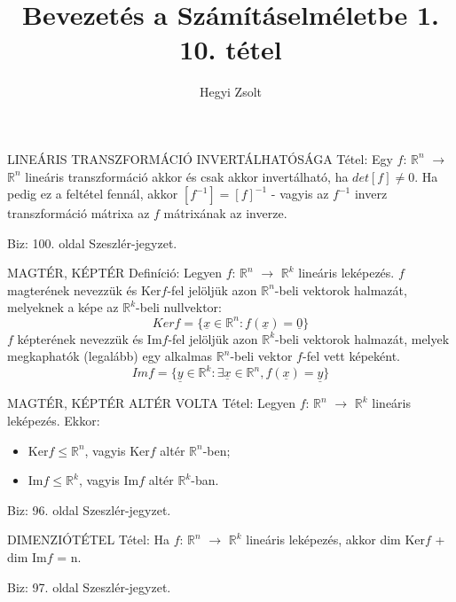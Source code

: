 \documentclass[]{article}
\title{Bevezetés a Számításelméletbe 1.\\{\large 10. tétel}}
\author{Hegyi Zsolt}
\newcommand{\R}{\mathbb{R}}
\newcommand{\Rn}[1]{$\mathbb{R}^{#1}$}
\newcommand{\Und}[1]{\underline{#1}}
\begin{document}
\maketitle{}
\begin{framed}
LINEÁRIS TRANSZFORMÁCIÓ INVERTÁLHATÓSÁGA Tétel: Egy $f$: \Rn{n} $\rightarrow$ \Rn{n} lineáris transzformáció akkor és csak akkor invertálható, ha $det[f] \neq 0$. Ha pedig ez a feltétel fennál, akkor $[f^{-1}] = [f]^{-1}$ - vagyis az $f^{-1}$ inverz transzformáció mátrixa az $f$ mátrixának az inverze.
\end{framed}
\begin{leftbar}
Biz: 100. oldal Szeszlér-jegyzet.
\end{leftbar}
\begin{shaded}
MAGTÉR, KÉPTÉR Definíció: Legyen $f$: \Rn{n} $\rightarrow$ \Rn{k} lineáris leképezés. $f$ magterének nevezzük és Ker$f$-fel jelöljük azon \Rn{n}-beli vektorok halmazát, melyeknek a képe az \Rn{k}-beli nullvektor:
$$Kerf = \{\Und{x}\in \R^n : f(\Und{x}) = \Und{0}\}$$
$f$ képterének nevezzük és Im$f$-fel jelöljük azon \Rn{k}-beli vektorok halmazát, melyek megkaphatók (legalább) egy alkalmas \Rn{n}-beli vektor $f$-fel vett képeként.
$$Imf = \{\Und{y} \in \R^k : \exists\Und{x} \in \R^n, f(\Und{x}) = \Und{y}\}$$
\end{shaded}
\begin{framed}
MAGTÉR, KÉPTÉR ALTÉR VOLTA Tétel: Legyen $f$: \Rn{n} $\rightarrow$ \Rn{k} lineáris leképezés. Ekkor:
\begin{itemize}
\item Ker$f\leq\R^{n}$, vagyis Ker$f$ altér \Rn{n}-ben;
\item Im$f\leq\R^k$, vagyis Im$f$ altér \Rn{k}-ban.
\end{itemize}
\end{framed}
\begin{leftbar}
Biz: 96. oldal Szeszlér-jegyzet.
\end{leftbar}
\begin{framed}
DIMENZIÓTÉTEL Tétel: Ha $f$: \Rn{n} $\rightarrow$ \Rn{k} lineáris leképezés, akkor dim Ker$f$ + dim Im$f$ = n.
\end{framed}
\begin{leftbar}
Biz: 97. oldal Szeszlér-jegyzet.
\end{leftbar}
\end{document}
